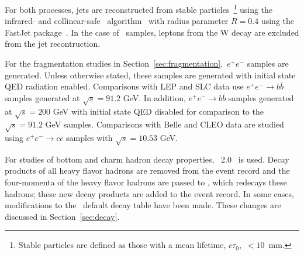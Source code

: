 For both processes, jets are reconstructed from stable particles~\footnote{Stable particles are defined as those with a mean lifetime, $c\tau_{0}$,~$< 10$~mm.} using the
infrared- and collinear-safe \antikt\ algorithm~\cite{bib:antikt2}
with radius parameter $R=0.4$ using the FastJet package~\cite{bib:antikt3}. In the case of \ttbar\ samples, leptons
from the W decay are excluded from the jet recontruction.


For the fragmentation studies in Section~\ref{sec:fragmentation},~$e^+e^-$ samples are generated.
Unless otherwise stated, 
these samples are generated with initial state QED radiation enabled. 
Comparisons with LEP and SLC data use $e^+e^-\rightarrow b\overline{b}$ samples
generated at $\sqrt{s}=91.2$ GeV. In addition, $e^+e^-\rightarrow b\overline{b}$ samples
generated at $\sqrt{s}=200$ GeV with initial state QED disabled for comparison to the $\sqrt{s}=91.2$ GeV samples. Comparisons with Belle and CLEO data are studied using  
$e^+e^-\rightarrow c\overline{c}$ samples with $\sqrt{s}=10.53$ GeV.

For studies of bottom and charm hadron decay properties, \EvtGen~2.0~\cite{Lange:2001uf} is used.
Decay products of all heavy flavor hadrons are removed from the event record and the four-momenta
of the heavy flavor hadrons are passed to \EvtGen, which redecays these hadrons; these new decay
products are added to the event record.
In some cases, modifications to the \EvtGen\ default decay table have been made.  These changes
are discussed in Section~\ref{sec:decay}.
